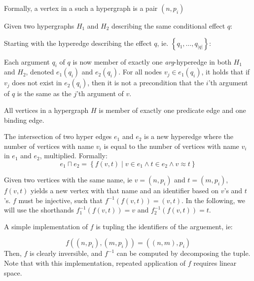 \documentclass[../Master.tex]{subfiles}
\begin{document}
Formally, a vertex in a such a hypergraph is a pair $\left(n,p_i \right)$

Given two hypergraphs $H_1$ and $H_2$ describing the same conditional effect $q$:

Starting with the hyperedge describing the effect $q$, ie. $\left\{ q_1, \dots, q_{|q|}  \right\}$:

Each argument $q_i$ of $q$ is now member of exactly one \emph{arg}-hyperedge in  both $H_1$ and $H_2$, denoted $e_1(q_i)$ and $e_2(q_i)$. For all nodes $v_j \in e_1(q_i)$, it holds that  if $v_j$ does not exist in $e_2(q_i)$, then it is not a precondition that the $i$'th argument of $q$ is the same as the $j$'th argument of $v$.

\begin{proposition}
    All vertices in a hypergraph $H$ is member of exactly one predicate edge and one binding edge.
\end{proposition}

\begin{definition}
    The intersection of two hyper edges $e_1$ and $e_2$ is a new hyperedge where the number of vertices with name $v_i$ is equal to the number of vertices with name $v_i$ in $e_1$ and $e_2$, multiplied. Formally:
    \begin{equation*}
        e_1 \sqcap e_2 = \left\{
            f(v, t) \; | \;
                v \in e_1 \land t \in e_2 \land v \approx t
        \right\}
    \end{equation*}
\end{definition}

\begin{definition}
    Given two vertices with the same name, ie $v = \left(n, p_i \right)$ and $t = \left( m, p_i \right)$, $f(v,t)$ yields a new vertex with that name and an identifier based on $v$'s and $t$'s. $f$ must be injective, such that $f^{-1}(f(v,t)) = (v,t)$. In the following, we will use the shorthands $f^{-1}_1(f(v,t)) = v$ and $f^{-1}_2(f(v,t)) = t$.
\end{definition}
 A simple implementation of $f$ is tupling the identifiers of the arguement, ie:

\begin{equation*}
    f\left( \left(n, p_i \right), \left(m, p_i \right) \right) =
        \left( (n,m), p_i \right)
\end{equation*}
Then, $f$ is clearly inversible, and $f^{-1}$ can be computed by decomposing the tuple. Note that with this implementation, repeated application of $f$ requires linear space.
\end{document}
